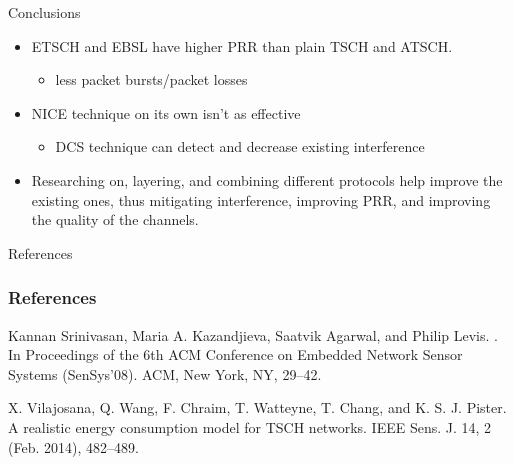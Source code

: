 \documentclass[t]{beamer}
\begin{document}
\begin{frame}{Conclusions}
\begin{itemize}
  \item ETSCH and EBSL have higher PRR than plain TSCH and ATSCH.  
    \begin{itemize}
        \item less packet bursts/packet losses
    \end{itemize}
  \item NICE technique on its own isn't as effective
    \begin{itemize}
        \item DCS technique can detect and decrease existing interference
    \end{itemize}
\end{itemize}
\begin{itemize}
  \item Researching on, layering, and combining different protocols help improve the existing ones, thus mitigating interference, improving PRR, and improving the quality of the channels.  
\end{itemize}
\end{frame}

\begin{frame}{References}
 
 
  \frametitle<presentation>{References}    
  \begin{thebibliography}{10}    
  \beamertemplatearticlebibitems
    Kannan Srinivasan, Maria A. Kazandjieva, Saatvik Agarwal, and Philip Levis.
    .
    \newblock In Proceedings of the 6th ACM Conference on Embedded Network Sensor Systems (SenSys’08).
ACM, New York, NY, 29–42.
    
  \beamertemplatearticlebibitems
    X. Vilajosana, Q. Wang, F. Chraim, T. Watteyne, T. Chang, and K. S. J. Pister.
    \newblock A realistic energy consumption
model for TSCH networks.
    \newblock IEEE Sens. J. 14, 2 (Feb. 2014), 482–489.
  \end{thebibliography}


\end{frame}
\end{document}
